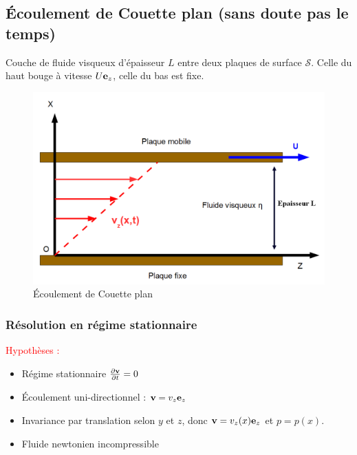 \documentclass[11pt,a4paper]{report}
\begin{document}
\newpage
\subsection{Écoulement de Couette plan (sans doute pas le temps)}\label{sec:3.2}

Couche de fluide visqueux d'épaisseur $L$ entre deux plaques de surface $\mathcal{S}$. Celle du haut bouge à vitesse $U \bold{e}_z$, celle du bas est fixe.

\begin{figure}[h!]
\begin{center}
	\includegraphics[scale = 0.3]{couette_plan.png}
	\caption{\'Ecoulement de Couette plan} 
	\label{fig:couette_plan}
\end{center}
\end{figure}

\subsubsection{Résolution en régime stationnaire}

\textcolor{red}{Hypothèses :}
\begin{itemize}
	\item Régime stationnaire $\frac{\partial \bold{v}}{\partial t} = 0$
	\item \'Ecoulement uni-directionnel : $\bold{v} = v_z \bold{e}_z$
	\item Invariance par translation selon $y$ et $z$, donc $\bold{v} = v_z(x) \bold{e}_z$ et $p = p(x)$.
	\item Fluide newtonien incompressible\\
\end{itemize}
\end{document}
